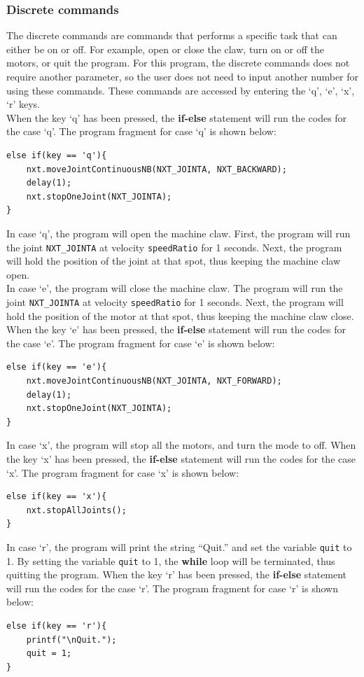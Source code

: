 \documentclass[11pt]{article}
\begin{document}
\subsubsection*{Discrete commands}
The discrete commands are commands that performs a specific task that can either 
be on or off. For example, open or close the claw, turn on or off the motors, or 
quit the program. For this program, the discrete commands does not require another 
parameter, so the user does not need to input another number for using these 
commands. These commands are accessed by entering the `q', `e', `x', `r' keys.\\
When the key `q' has been pressed, the {\bf if-else} statement will run 
the codes for the case `q'. The program fragment for case `q' is shown below:
\begin{lstlisting}
else if(key == 'q'){
    nxt.moveJointContinuousNB(NXT_JOINTA, NXT_BACKWARD);
    delay(1);
    nxt.stopOneJoint(NXT_JOINTA);
}
\end{lstlisting}
In case `q', the program will open the machine claw. First, the program will run 
the joint {\tt NXT\_JOINTA} at velocity {\tt speedRatio} for 1 seconds. Next, 
the program will hold the position of the joint at that spot, thus keeping the 
machine claw open. \\
In case `e', the program will close the machine claw. The program will run the 
joint {\tt NXT\_JOINTA} at velocity {\tt speedRatio} for 1 seconds. Next, the 
program will hold the position of the motor at that spot, thus keeping the 
machine claw close.\\

When the key `e' has been pressed, the {\bf if-else} statement will run 
the codes for the case `e'. The program fragment for case `e' is shown below:
\begin{lstlisting}
else if(key == 'e'){
    nxt.moveJointContinuousNB(NXT_JOINTA, NXT_FORWARD);
    delay(1);
    nxt.stopOneJoint(NXT_JOINTA);
}
\end{lstlisting}
In case `x', the program will stop all the motors, and turn the mode to off. 
When the key `x' has been pressed, the {\bf if-else} statement will run the 
codes for the case `x'. The program fragment for case `x' is shown below:
\begin{lstlisting}
else if(key == 'x'){
    nxt.stopAllJoints();
}
\end{lstlisting}
In case `r', the program will print the string ``Quit.'' and set the variable 
{\tt quit} to 1. By setting the variable {\tt quit} to 1, the {\bf while} loop 
will be terminated, thus quitting the program. When the key `r' has been pressed, 
the {\bf if-else} statement will run the codes for the case `r'. The program 
fragment for case `r' is shown below:
\begin{lstlisting}
else if(key == 'r'){
    printf("\nQuit.");
    quit = 1;
}
\end{lstlisting}
\end{document}
